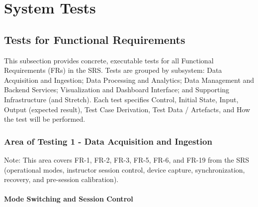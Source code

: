 \documentclass[12pt, titlepage]{article}
\begin{document}




\section{System Tests}

\subsection{Tests for Functional Requirements}

This subsection provides concrete, executable tests for all Functional Requirements (FRs) in the SRS.
Tests are grouped by subsystem: Data Acquisition and Ingestion; Data Processing and Analytics; Data
Management and Backend Services; Visualization and Dashboard Interface; and Supporting Infrastructure
(and Stretch). Each test specifies Control, Initial State, Input, Output (expected result), Test Case
Derivation, Test Data / Artefacts, and How the test will be performed.

\subsubsection{Area of Testing 1 - Data Acquisition and Ingestion}

Note: This area covers FR-1, FR-2, FR-3, FR-5, FR-6, and FR-19 from the SRS (operational modes, instructor session control, device capture, synchronization, recovery, and pre-session calibration).

\paragraph{Mode Switching and Session Control}
\end{document}
